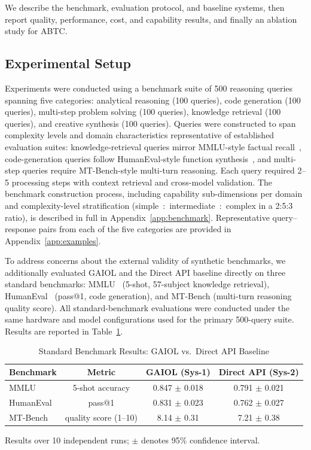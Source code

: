 \documentclass{iopjournal}
\begin{document}
We describe the benchmark, evaluation protocol, and baseline systems, then report quality, performance, cost, and capability results, and finally an ablation study for ABTC.

\subsection{Experimental Setup}

Experiments were conducted using a benchmark suite of 500 reasoning
queries spanning five categories: analytical reasoning (100 queries),
code generation (100 queries), multi-step problem solving (100 queries),
knowledge retrieval (100 queries), and creative synthesis (100 queries).
Queries were constructed to span complexity levels and domain characteristics
representative of established evaluation suites: knowledge-retrieval queries
mirror MMLU-style factual recall~\cite{HolisticEval}, code-generation queries
follow HumanEval-style function synthesis~\cite{chen2024evolution}, and multi-step queries
require MT-Bench-style multi-turn reasoning.
Each query required 2--5 processing steps with context retrieval and
cross-model validation. The benchmark construction process, including capability sub-dimensions per domain and complexity-level stratification (simple~:~intermediate~:~complex in a 2:5:3 ratio), is described in full in Appendix~\ref{app:benchmark}. Representative query--response pairs from each of the five categories are provided in Appendix~\ref{app:examples}.

To address concerns about the external validity of synthetic benchmarks, we additionally evaluated GAIOL and the Direct API baseline directly on three standard benchmarks: MMLU~\cite{HolisticEval} (5-shot, 57-subject knowledge retrieval), HumanEval~\cite{chen2024evolution} (pass@1, code generation), and MT-Bench (multi-turn reasoning quality score). All standard-benchmark evaluations were conducted under the same hardware and model configurations used for the primary 500-query suite. Results are reported in Table~\ref{tab:standard_benchmarks}.

\begin{table}[H]
\centering
\caption{Standard Benchmark Results: GAIOL vs.~Direct API Baseline}
\label{tab:standard_benchmarks}
\begin{tabular}{@{}lccc@{}}
\toprule
\textbf{Benchmark} & \textbf{Metric} & \textbf{GAIOL (Sys-1)} & \textbf{Direct API (Sys-2)} \\
\midrule
MMLU & 5-shot accuracy & 0.847 $\pm$ 0.018 & 0.791 $\pm$ 0.021 \\
HumanEval & pass@1 & 0.831 $\pm$ 0.023 & 0.762 $\pm$ 0.027 \\
MT-Bench & quality score (1--10) & 8.14 $\pm$ 0.31 & 7.21 $\pm$ 0.38 \\
\bottomrule
\end{tabular}

\vspace{1mm}
{\raggedright\footnotesize Results over 10 independent runs; $\pm$ denotes 95\% confidence interval.\par}
\end{table}
\end{document}
